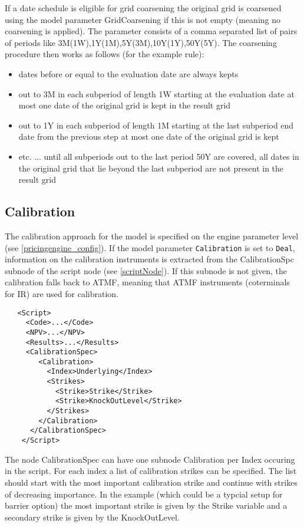 If a date schedule is eligible for grid coarsening the original grid is coarsened using the model parameter
GridCoarsening if this is not empty (meaning no coarsening is applied). The parameter consists of a comma separated list
of pairs of periods like 3M(1W),1Y(1M),5Y(3M),10Y(1Y),50Y(5Y). The coarsening procedure then works as follows (for the
example rule):

\begin{itemize}
\item dates before or equal to the evaluation date are always kepts
\item out to 3M in each subperiod of length 1W starting at the evaluation date at most one date of the original grid is
  kept in the result grid
\item out to 1Y in each subperiod of length 1M starting at the last subperiod end date from the previous step at most
  one date of the original grid is kept
\item etc. ... until all subperiods out to the last period 50Y are covered, all dates in the original grid that lie
  beyond the last subperiod are not present in the result grid
\end{itemize}

\subsection{Calibration}\label{calibration}

The calibration approach for the model is specified on the engine parameter level (see \ref{pricingengine_config}). If
the model parameter \verb+Calibration+ is set to \verb+Deal+, information on the calibration instruments is extracted
from the CalibrationSpc subnode of the script node (see \ref{scriptNode}). If this subnode is not given, the calibration
falls back to ATMF, meaning that ATMF instruments (coterminals for IR) are used for calibration.

\begin{verbatim}
   <Script>
     <Code>...</Code>
     <NPV>...</NPV>
     <Results>...</Results>
     <CalibrationSpec>
        <Calibration>
          <Index>Underlying</Index>
          <Strikes>
            <Strike>Strike</Strike>
            <Strike>KnockOutLevel</Strike>
          </Strikes>
        </Calibration>
      </CalibrationSpec>
    </Script>
\end{verbatim}

The node CalibrationSpec can have one subnode Calibration per Index occuring in the script. For each index a list of
calibration strikes can be specified. The list should start with the most important calibration strike and continue with
strikes of decreasing importance. In the example (which could be a typcial setup for barrier option) the most important
strike is given by the Strike variable and a secondary strike is given by the KnockOutLevel.

